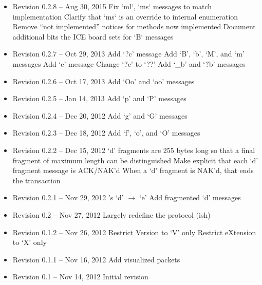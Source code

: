 \documentclass{article}
\begin{document}
\begin{itemize}

\item Revision 0.2.8 -- Aug 30, 2015
\subitem Fix `ml`, `ms` messages to match implementation
\subitem Clarify that `ms` is an override to internal enumeration
\subitem Remove ``not implemented'' notices for methods now implemented
\subitem Document additional bits the ICE board sets for `B` messages

\item Revision 0.2.7 -- Oct 29, 2013
\subitem Add `?c' message
\subitem Add `B', `b', `M', and `m' messages
\subitem Add `e' message
\subitem Change `?c' to `??'
\subitem Add `\_b' and `?b' messages

\item Revision 0.2.6 -- Oct 17, 2013
\subitem Add `Oo' and `oo' messages

\item Revision 0.2.5 -- Jan 14, 2013
\subitem Add `p' and `P' messages

\item Revision 0.2.4 -- Dec 20, 2012
\subitem Add `g' and `G' messages

\item Revision 0.2.3 -- Dec 18, 2012
\subitem Add `f', `o', and `O' messages

\item Revision 0.2.2 -- Dec 15, 2012
\subitem `d' fragments are 255 bytes long so that a final fragment of maximum
length can be distinguished
\subitem Make explicit that each `d' fragment message is ACK/NAK'd
\subitem When a `d' fragment is NAK'd, that ends the transaction

\item Revision 0.2.1 -- Nov 29, 2012
's `d' $\rightarrow$ `e'
\subitem Add fragmented `d' messages

\item Revision 0.2 -- Nov 27, 2012
\subitem Largely redefine the protocol (ish)

\item Revision 0.1.2 -- Nov 26, 2012
\subitem Restrict Version to `V' only
\subitem Restrict eXtension to `X' only

\item Revision 0.1.1 -- Nov 16, 2012
\subitem Add visualized packets

\item Revision 0.1 -- Nov 14, 2012
\subitem Initial revision

\end{itemize}
\end{document}
